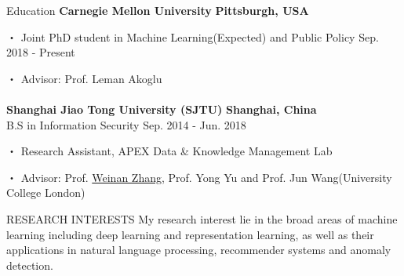 \documentclass{resume} %
\begin{document}
\vspace{-1em}

\vspace{20pt}
\begin{rSection}{Education}
\textbf{Carnegie Mellon University} \hfill \textbf{Pittsburgh, USA}
\vspace{-5pt}
\item[・]Joint PhD student in Machine Learning(Expected) and Public Policy \hfill Sep. 2018 - Present
\vspace{-5pt}
\item[・]Advisor: Prof. Leman Akoglu \\ \\
\textbf{Shanghai Jiao Tong University (SJTU)} \hfill \textbf{Shanghai, China}\\ %
B.S in Information Security \hfill Sep. 2014 - Jun. 2018
\vspace{-5pt}
\item[・] Research Assistant, APEX Data \& Knowledge Management Lab
\vspace{-5pt}
\item[・] Advisor: Prof. \href{http://wnzhang.net}{Weinan Zhang}, Prof. Yong Yu and Prof. Jun Wang(University College London)
\end{rSection}

\begin{rSection}{RESEARCH INTERESTS}
My research interest lie in the broad areas of machine learning including deep learning and representation learning, as well as their applications in natural language processing, recommender systems and anomaly detection.
\end{rSection}
\end{document}
